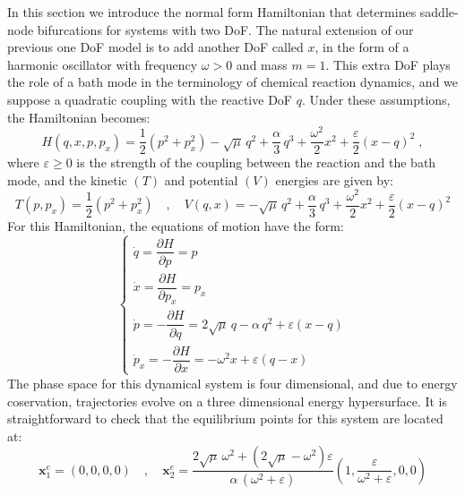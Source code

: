\documentclass[8pt]{article}
\begin{document}
In this section we introduce the normal form Hamiltonian that determines saddle-node bifurcations for systems with two DoF. The natural extension of our previous one DoF model is to add another DoF called $x$, in the form of a harmonic oscillator with frequency $\omega > 0$ and mass $m = 1$. This extra DoF plays the role of a bath mode in the terminology of chemical reaction dynamics, and we suppose a quadratic coupling with the reactive DoF $q$. Under these assumptions, the Hamiltonian becomes:
\begin{equation}
H(q,x,p,p_x) = \dfrac{1}{2} \left(p^2 + p_x^2 \right) - \sqrt{\mu} \, q^2 + \frac{\alpha}{3} \,q^3 + \dfrac{\omega^2}{2} x^2 + \dfrac{\varepsilon}{2} \left(x-q\right)^2 \; ,
\label{eq:ham_2dof}
\end{equation}
where $\varepsilon \geqslant 0$ is the strength of the coupling between the reaction and the bath mode, and the kinetic $(T)$ and potential $(V)$ energies are given by:
\begin{equation}
T(p,p_x) = \frac{1}{2}\left(p^2 + p_x^2\right) \quad,\quad V(q,x) = - \sqrt{\mu} \, q^2 + \frac{\alpha}{3} \,q^3 + \dfrac{\omega^2}{2} x^2 + \dfrac{\varepsilon}{2} \left(x-q\right)^2
\label{eq:pes_2dof}
\end{equation}
For this Hamiltonian, the equations of motion have the form:
\begin{equation}
\begin{cases}
\dot{q} = \dfrac{\partial H}{\partial p} =  p \\[.4cm]
\dot{x} = \dfrac{\partial H}{\partial p_x} = p_x \\[.4cm]
\dot{p} = -\dfrac{\partial H}{\partial q} =  2\sqrt{\mu} \, q - \alpha \, q^2 + \varepsilon (x - q) \\[.4cm]
\dot{p}_x = -\dfrac{\partial H}{\partial x} = -\omega^2 x + \varepsilon (q-x) 
\end{cases}
\label{eq:hameq_2dof}
\end{equation}
The phase space for this dynamical system is four dimensional, and due to energy coservation, trajectories evolve on a three dimensional energy hypersurface. It is straightforward to check that the equilibrium points for this system are located at:
\begin{equation}
\mathbf{x}_1^e = (0,0,0,0) \quad,\quad \mathbf{x}_2^e = 
\frac{2\sqrt{\mu} \, \omega^2 + \left(2\sqrt{\mu}-\omega^2\right)\varepsilon}{\alpha \, (\omega^2 + \varepsilon)}
\left(1,\frac{\varepsilon}{\omega^2 + \varepsilon},0,0\right)
\label{eq:cfSp_eqCoords}
\end{equation}
\end{document}
